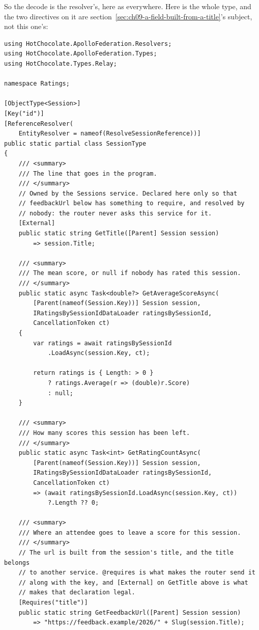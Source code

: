 %
So the decode is the resolver's, here as everywhere. Here is the whole type,
and the two directives on it are section~\ref{sec:ch09-a-field-built-from-a-title}'s
subject, not this one's:

\begin{verbatim}
using HotChocolate.ApolloFederation.Resolvers;
using HotChocolate.ApolloFederation.Types;
using HotChocolate.Types.Relay;

namespace Ratings;

[ObjectType<Session>]
[Key("id")]
[ReferenceResolver(
    EntityResolver = nameof(ResolveSessionReference))]
public static partial class SessionType
{
    /// <summary>
    /// The line that goes in the program.
    /// </summary>
    // Owned by the Sessions service. Declared here only so that
    // feedbackUrl below has something to require, and resolved by
    // nobody: the router never asks this service for it.
    [External]
    public static string GetTitle([Parent] Session session)
        => session.Title;

    /// <summary>
    /// The mean score, or null if nobody has rated this session.
    /// </summary>
    public static async Task<double?> GetAverageScoreAsync(
        [Parent(nameof(Session.Key))] Session session,
        IRatingsBySessionIdDataLoader ratingsBySessionId,
        CancellationToken ct)
    {
        var ratings = await ratingsBySessionId
            .LoadAsync(session.Key, ct);

        return ratings is { Length: > 0 }
            ? ratings.Average(r => (double)r.Score)
            : null;
    }

    /// <summary>
    /// How many scores this session has been left.
    /// </summary>
    public static async Task<int> GetRatingCountAsync(
        [Parent(nameof(Session.Key))] Session session,
        IRatingsBySessionIdDataLoader ratingsBySessionId,
        CancellationToken ct)
        => (await ratingsBySessionId.LoadAsync(session.Key, ct))
            ?.Length ?? 0;

    /// <summary>
    /// Where an attendee goes to leave a score for this session.
    /// </summary>
    // The url is built from the session's title, and the title belongs
    // to another service. @requires is what makes the router send it
    // along with the key, and [External] on GetTitle above is what
    // makes that declaration legal.
    [Requires("title")]
    public static string GetFeedbackUrl([Parent] Session session)
        => "https://feedback.example/2026/" + Slug(session.Title);


\end{verbatim}
